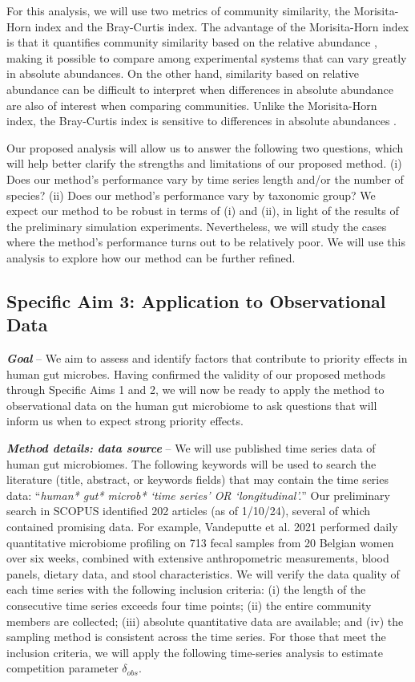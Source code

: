 \documentclass[12pt, class=article, crop=false]{standalone}
\begin{document}
For this analysis, we will use two metrics of community similarity, the Morisita-Horn index and the Bray-Curtis index.
The advantage of the Morisita-Horn index is that it quantifies community similarity based on the relative abundance \citep{magurran_biological_2011}, making it possible to compare among experimental systems that can vary greatly in absolute abundances.
On the other hand, similarity based on relative abundance can be difficult to interpret when differences in absolute abundance are also of interest when comparing communities.
Unlike the Morisita-Horn index, the Bray-Curtis index is sensitive to differences in absolute abundances \citep{magurran_biological_2011}.

Our proposed analysis will allow us to answer the following two questions, which will help better clarify the strengths and limitations of our proposed method.
(i) Does our method's performance vary by time series length and/or the number of species?
(ii) Does our method's performance vary by taxonomic group?
We expect our method to be robust in terms of (i) and (ii), in light of the results of the preliminary simulation experiments.
Nevertheless, we will study the cases where the method's performance turns out to be relatively poor.
We will use this analysis to explore how our method can be further refined.

\subsection*{Specific Aim 3: Application to Observational Data}

\textbf{\textit{Goal}} -- 
We aim to assess and identify factors that contribute to priority effects in human gut microbes.
Having confirmed the validity of our proposed methods through Specific Aims 1 and 2, we will now be ready to apply the method to observational data on the human gut microbiome to ask questions that will inform us when to expect strong priority effects.

\textit{\textbf{Method details: data source}} --
We will use published time series data of human gut microbiomes.
The following keywords will be used to search the literature (title, abstract, or keywords fields) that may contain the time series data: ``\textit{human* gut* microb* `time series' OR `longitudinal'.}''
Our preliminary search in SCOPUS identified 202 articles (as of 1/10/24), several of which contained promising data.
For example, Vandeputte et al. 2021 \citep{vandeputte_temporal_2021} performed daily quantitative microbiome profiling on 713 fecal samples from 20 Belgian women over six weeks, combined with extensive anthropometric measurements, blood panels, dietary data, and stool characteristics. 
We will verify the data quality of each time series with the following inclusion criteria: (i) the length of the consecutive time series exceeds four time points; (ii) the entire community members are collected; (iii) absolute quantitative data are available; and (iv) the sampling method is consistent across the time series.
For those that meet the inclusion criteria, we will apply the following time-series analysis to estimate competition parameter $\delta_{obs}$.
\end{document}
